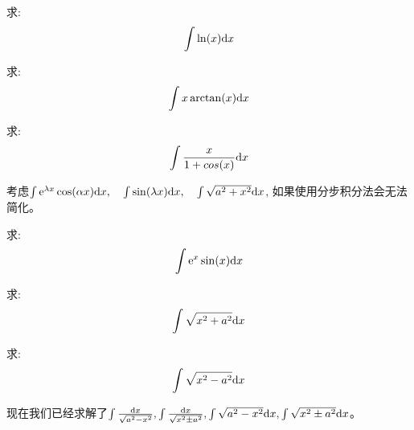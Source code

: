 \begin{example}
    求:
    \begin{equation*}
        \int \ln(x) \mathrm{d} x
    \end{equation*}
\end{example}
\begin{solution}
    
\end{solution}

\begin{example}
    求:
    \begin{equation*}
        \int x\arctan(x) \mathrm{d} x
    \end{equation*}
\end{example}
\begin{solution}
    
\end{solution}

\begin{example}
    求:
    \begin{equation*}
        \int \frac{x}{1+cos(x)} \mathrm{d} x
    \end{equation*}
\end{example}
\begin{solution}
    
\end{solution}
考虑$\int \mathrm{e}^{\lambda x} \cos(\alpha x) \mathrm{d} x, \quad \int \sin(\lambda x) \mathrm{d} x, \quad \int \sqrt{a^2 + x^2} \mathrm{d} x$, 如果使用分步积分法会无法简化。
\begin{example}
    求:
    \begin{equation*}
        \int \mathrm{e}^x \sin(x) \mathrm{d} x
    \end{equation*}
\end{example}
\begin{solution}
    
\end{solution}

\begin{example}
    求:
    \begin{equation*}
        \int \sqrt{x^2+a^2} \mathrm{d} x
    \end{equation*}
\end{example}
\begin{solution}
    
\end{solution}

\begin{example}
    求:
    \begin{equation*}
        \int \sqrt{x^2-a^2} \mathrm{d} x
    \end{equation*}
\end{example}
\begin{solution}
    
\end{solution}
\begin{remark}
    现在我们已经求解了$\int \frac{\mathrm{d} x}{\sqrt{a^2-x^2}}, \int \frac{\mathrm{d} x}{\sqrt{x^2 \pm a^2}}, \int \sqrt{a^2-x^2} \mathrm{d} x, \int \sqrt{x^2\pm a^2} \mathrm{d} x$。
\end{remark}

